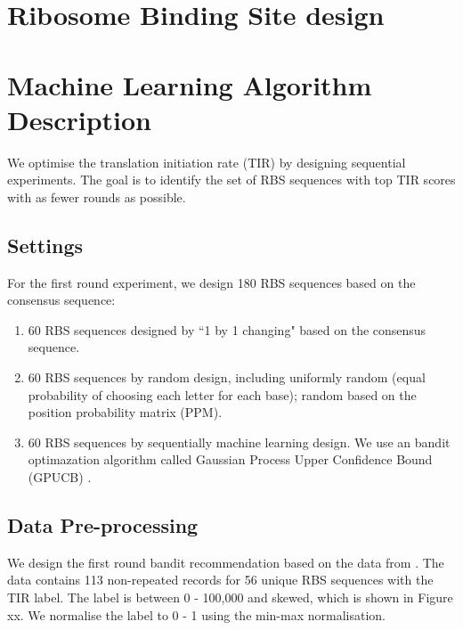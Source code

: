 \documentclass{article}
\begin{document}
\section{Ribosome Binding Site design}


\section{Machine Learning Algorithm Description}

We optimise the translation initiation rate (TIR) by designing sequential experiments. The goal is to identify the set of RBS sequences with top TIR scores with as fewer rounds as possible. 

\subsection{Settings}

For the first round experiment, we design 180 RBS sequences based on the consensus sequence: 

\begin{enumerate}
    \item 60 RBS sequences designed by ``1 by 1 changing" based on the consensus sequence.
    \item 60 RBS sequences by random design, including uniformly random (equal probability of choosing each letter for each base); random based on the position probability matrix (PPM).
    \item 60 RBS sequences by sequentially machine learning design. We use an bandit optimazation algorithm called Gaussian Process Upper Confidence Bound (GPUCB) \cite{srinivas2012information}.   
\end{enumerate}{}

\subsection{Data Pre-processing}

We design the first round bandit recommendation based on the data from \textcite{jervis2018machine}. The data contains 113 non-repeated records for 56 unique RBS sequences with the TIR label. The label is between 0 - 100,000 and skewed, which is shown in Figure xx. We normalise the label to 0 - 1 using the min-max normalisation. 
\end{document}
